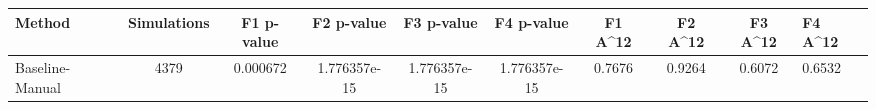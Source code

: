 \begin{tabular}{lcccccccc}
\toprule
         Method &  Simulations &  F1 p-value &   F2 p-value &   F3 p-value &   F4 p-value &  F1 A^12 &  F2 A^12 &  F3 A^12 &  F4 A^12 \\
\midrule
Baseline-Manual &         4379 &    0.000672 & 1.776357e-15 & 1.776357e-15 & 1.776357e-15 &   0.7676 &   0.9264 &   0.6072 &   0.6532 \\
\bottomrule
\end{tabular}
